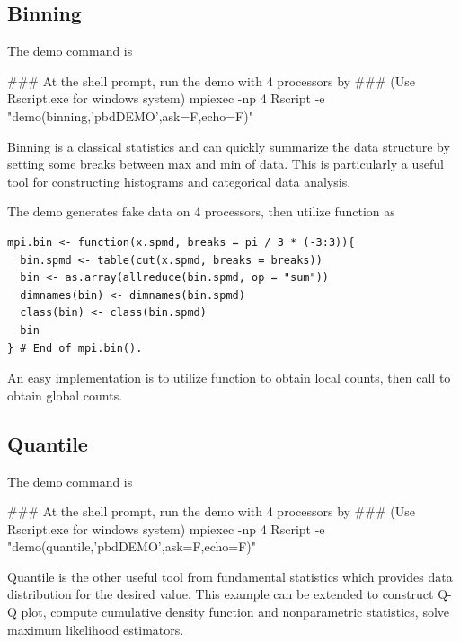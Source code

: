 \subsection[Binning]{Binning}
\label{sec:binning}

The demo command is
\begin{Command}
### At the shell prompt, run the demo with 4 processors by
### (Use Rscript.exe for windows system)
mpiexec -np 4 Rscript -e "demo(binning,'pbdDEMO',ask=F,echo=F)"
\end{Command}

Binning is a classical statistics and can quickly summarize
the data structure by setting some breaks between max and min of data.
This is particularly a useful tool for constructing histograms and
categorical data analysis.

The demo  generates fake data on 4 processors, then
utilize  function as
\begin{lstlisting}[language=rr,title=R Code]
mpi.bin <- function(x.spmd, breaks = pi / 3 * (-3:3)){
  bin.spmd <- table(cut(x.spmd, breaks = breaks))
  bin <- as.array(allreduce(bin.spmd, op = "sum"))
  dimnames(bin) <- dimnames(bin.spmd)
  class(bin) <- class(bin.spmd)
  bin
} # End of mpi.bin().
\end{lstlisting}
An easy implementation is to utilize  function to obtain
local counts, then call  to obtain global counts.



\subsection[Quantile]{Quantile}
\label{sec:quantile}

The demo command is
\begin{Command}
### At the shell prompt, run the demo with 4 processors by
### (Use Rscript.exe for windows system)
mpiexec -np 4 Rscript -e "demo(quantile,'pbdDEMO',ask=F,echo=F)"
\end{Command}

Quantile is the other useful tool from fundamental statistics
which provides data distribution for the desired value.
This example can be extended to construct Q-Q plot,
compute cumulative density function and nonparametric statistics,
solve maximum likelihood estimators.

